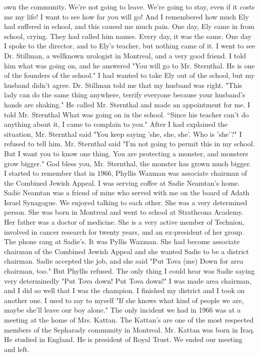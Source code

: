 own the community. We're not going to leave. We're going to stay, even 
if it costs me my life! I want to see how far you will go! And I remembered 
how much Ely had suffered in school, and this caused me much pain. 
One day, Ely came in from school, crying. They had called him names. 
Every day, it was the same. One day I spoke to the director, and to 
Ely's teacher, but nothing came of it. I went to see Dr. Stillman, a wellknown urologist in Montreal, and a very good friend. I told him what was 
going on, and he answered "You will go to Mr. Sternthal. He is one of 
the founders of the school." I had wanted to take Ely out of the school, 
but my husband didn't agree. Dr. Stillman told me that my husband was 
right. "This lady can do the same thing anywhere, terrify everyone because your husband's hands are shaking." He called Mr. Sternthal and made an appointment for me. 
I told Mr. Sternthal What was going on in the school. “Since his teacher can't do anything about it, I came to complain to you." After I had explained the situation, Mr. Sternthal said 
"You keep saying 'she, she, she'. Who is 'she'?" I refused to tell him. 
Mr. Sternthal said "I'm not going to permit this in my school. But I want 
you to know one thing. You are protecting a monster, and monsters grow 
bigger." God bless you, Mr. Sternthal, the monster has grown much bigger. 
I started to remember that in 1966, Phyllis Waxman was associate chairman of the Combined Jewish Appeal. I was serving coffee at Sadie Neamtan's 
home. Sadie Neamtan was a friend of mine who served with me on the board 
of Adath Israel Synagogue. We enjoyed talking to each other. She was a 
very determined person. She was born in Montreal and went to school at 
Strathcona Academy. Her father was a doctor of medicine. She is a very 
active member of Technion, involved in cancer research for twenty years, and 
an ex-president of her group. 
The phone rang at Sadie's. It was Pyllis Waxman. She had become
associate chairman of the Combined Jewish Appeal and she wanted 
Sadie to be a district chairman. Sadie accepted the job, and she said "Put Tova (me) 
Down for area chairman, too." But Phyllis refused. The only thing I could hear was Sadie saying very determinedly "Put Tova down! Put Tova down!" I was made area chairman, and I did so well that I was the champion. I finished my district and I took on another one. I used to say 
to myself "If she knows what kind of people we are, maybe she'll leave our boy alone." 
The only incident we had in 1966 was at a meeting at the home of Mrs. 
Kattan. The Kattan's are one of the most respected members of the Sepharady community in Montreal. Mr. Kattan was born in Iraq. He studied in England. He is president of Royal Trust. We ended our meeting and left. 
